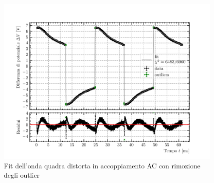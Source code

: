 \documentclass{article}[a4paper, oneside ,11pt]
\begin{document}
\begin{figure}[!htb]
	\centering 
 		\includegraphics[scale=0.9]{./AC_out.pdf}
 	\caption{Fit dell'onda quadra distorta in accoppiamento AC con rimozione degli outlier \label{plt:AC_out}}
\end{figure}
\end{document}
